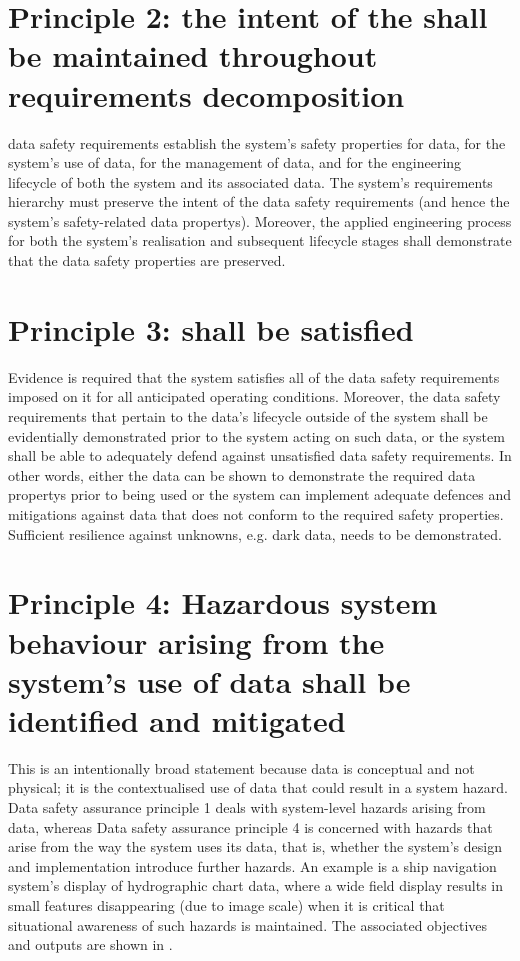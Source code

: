 \section{Principle 2: the intent of the  shall be maintained throughout requirements decomposition}
\Glspl{data safety requirement} establish the system's safety properties for data, for the system's use of data, for the management of data, and for the engineering lifecycle of both the system and its associated data. The system's requirements hierarchy must preserve the intent of the \glspl{data safety requirement} (and hence the system's safety-related \glspl{data property}). Moreover, the applied engineering process for both the system's realisation and subsequent lifecycle stages shall demonstrate that the data safety properties are preserved. 
\section{Principle 3:  shall be satisfied}
Evidence is required that the system satisfies all of the \glspl{data safety requirement} imposed on it for all anticipated operating conditions. Moreover, the \glspl{data safety requirement} that pertain to the data's lifecycle outside of the system shall be evidentially demonstrated prior to the system acting on such data, or the system shall be able to adequately defend against unsatisfied \glspl{data safety requirement}. In other words, either the data can be shown to demonstrate the required \glspl{data property} prior to being used or the system can implement adequate defences and \glspl{mitigation} against data that does not conform to the required safety properties.  Sufficient resilience against unknowns, e.g. dark data, needs to be demonstrated.
\section{Principle 4: Hazardous system behaviour arising from the system's use of data shall be identified and mitigated}
This is an intentionally broad statement because data is conceptual and not physical; it is the contextualised use of data that could result in a system hazard. Data safety assurance principle 1 deals with system-level hazards arising from data, whereas Data safety assurance principle 4 is concerned with hazards that arise from the way the system uses its data, that is, whether the system's design and implementation introduce further hazards. An example is a ship navigation system's display of hydrographic chart data, where a wide field display results in small features disappearing (due to image scale) when it is critical that situational awareness of such hazards is maintained. The associated objectives and outputs are shown in .
